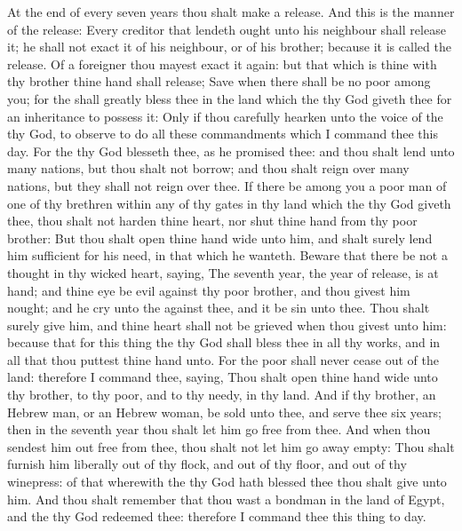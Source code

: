 \begin{biblechapter} %
 At the end of every seven years thou shalt make a release.
\verse And this is the manner of the release: Every creditor that lendeth ought unto his neighbour shall release it; he shall not exact it of his neighbour, or of his brother; because it is called the \LORDs release.
\verse Of a foreigner thou mayest exact it again: but that which is thine with thy brother thine hand shall release;
\verse Save when there shall be no poor among you; for the \LORD shall greatly bless thee in the land which the \LORD thy God giveth thee for an inheritance to possess it:
\verse Only if thou carefully hearken unto the voice of the \LORD thy God, to observe to do all these commandments which I command thee this day.
\verse For the \LORD thy God blesseth thee, as he promised thee: and thou shalt lend unto many nations, but thou shalt not borrow; and thou shalt reign over many nations, but they shall not reign over thee.
\verse If there be among you a poor man of one of thy brethren within any of thy gates in thy land which the \LORD thy God giveth thee, thou shalt not harden thine heart, nor shut thine hand from thy poor brother:
\verse But thou shalt open thine hand wide unto him, and shalt surely lend him sufficient for his need, in that which he wanteth.
\verse Beware that there be not a thought in thy wicked heart, saying, The seventh year, the year of release, is at hand; and thine eye be evil against thy poor brother, and thou givest him nought; and he cry unto the \LORD against thee, and it be sin unto thee.
\verse Thou shalt surely give him, and thine heart shall not be grieved when thou givest unto him: because that for this thing the \LORD thy God shall bless thee in all thy works, and in all that thou puttest thine hand unto.
\verse For the poor shall never cease out of the land: therefore I command thee, saying, Thou shalt open thine hand wide unto thy brother, to thy poor, and to thy needy, in thy land.
 And if thy brother, an Hebrew man, or an Hebrew woman, be sold unto thee, and serve thee six years; then in the seventh year thou shalt let him go free from thee.
\verse And when thou sendest him out free from thee, thou shalt not let him go away empty:
\verse Thou shalt furnish him liberally out of thy flock, and out of thy floor, and out of thy winepress: of that wherewith the \LORD thy God hath blessed thee thou shalt give unto him.
\verse And thou shalt remember that thou wast a bondman in the land of Egypt, and the \LORD thy God redeemed thee: therefore I command thee this thing to day.

\end{biblechapter}

